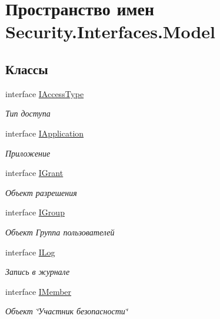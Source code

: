 \hypertarget{namespace_security_1_1_interfaces_1_1_model}{}\section{Пространство имен Security.\+Interfaces.\+Model}
\label{namespace_security_1_1_interfaces_1_1_model}
\subsection*{Классы}
\begin{DoxyCompactItemize}
\item 
interface \hyperlink{interface_security_1_1_interfaces_1_1_model_1_1_i_access_type}{I\+Access\+Type}
\begin{DoxyCompactList}\small\item\em Тип доступа \end{DoxyCompactList}\item 
interface \hyperlink{interface_security_1_1_interfaces_1_1_model_1_1_i_application}{I\+Application}
\begin{DoxyCompactList}\small\item\em Приложение \end{DoxyCompactList}\item 
interface \hyperlink{interface_security_1_1_interfaces_1_1_model_1_1_i_grant}{I\+Grant}
\begin{DoxyCompactList}\small\item\em Объект разрешения \end{DoxyCompactList}\item 
interface \hyperlink{interface_security_1_1_interfaces_1_1_model_1_1_i_group}{I\+Group}
\begin{DoxyCompactList}\small\item\em Объект Группа пользователей \end{DoxyCompactList}\item 
interface \hyperlink{interface_security_1_1_interfaces_1_1_model_1_1_i_log}{I\+Log}
\begin{DoxyCompactList}\small\item\em Запись в журнале \end{DoxyCompactList}\item 
interface \hyperlink{interface_security_1_1_interfaces_1_1_model_1_1_i_member}{I\+Member}
\begin{DoxyCompactList}\small\item\em Объект \char`\"{}Участник безопасности\char`\"{} \end{DoxyCompactList}\item 

\end{DoxyCompactItemize}
